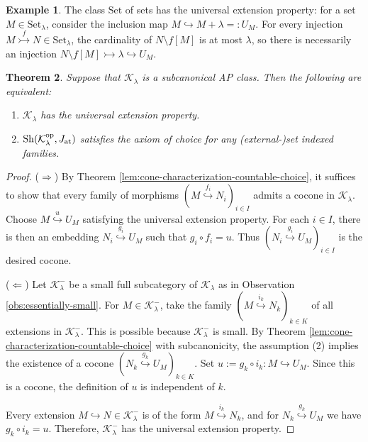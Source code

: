 \documentclass[10pt]{amsart}
\numberwithin{equation}{section}
\theoremstyle{plain}
\newtheorem{theorem}{Theorem}[section]
\theoremstyle{definition}
\newtheorem{example}[theorem]{Example}
\newcommand{\K}{\mathcal{K}}
\newcommand{\inj}{\rightarrowtail}
\newcommand{\mono}{\rightarrowtail}
\newcommand{\embed}{\hookrightarrow}
\newcommand{\monoedge}[1]{\overset{#1}{\inj}}
\newcommand{\embedge}[1]{\overset{#1}{\embed}}
\begin{document}
\begin{example}\label{exa:set-universal-extension}
The class $\mathrm{Set}$ of sets has the universal extension property:
for a set $M\in\mathrm{Set}_\lambda$, consider the inclusion map $M\embed M+\lambda=:U_M$.
For every injection $M\monoedge{f}N\in\mathrm{Set}_\lambda$, the cardinality of $N\setminus f[M]$ is at most $\lambda$, so there is necessarily an injection $N\setminus f[M]\mono \lambda\embed U_M$.
\end{example}

\begin{theorem}\label{thm:choice-vs-universal-extension}
Suppose that $\K_\lambda$ is a subcanonical AP class.
Then the following are equivalent:
\begin{enumerate}
\item $\K_\lambda$ has the universal extension property.
\item ${\rm Sh}(\K_\lambda^{\rm op},J_{\rm at})$ satisfies the axiom of choice for any (external-)set indexed families.
\end{enumerate}
\end{theorem}

\begin{proof}
($\Rightarrow$)
By Theorem \ref{lem:cone-characterization-countable-choice}, it suffices to show that every family of morphisms $(M\embedge{f_i} N_i)_{i\in I}$ admits a cocone in $\K_\lambda$.
Choose $M\embedge{u}U_M$ satisfying the universal extension property.
For each $i\in I$, there is then an embedding $N_i\embedge{g_i}U_M$ such that $g_i\circ f_i=u$.
Thus $(N_i\embedge{g_i}U_M)_{i\in I}$ is the desired cocone.

($\Leftarrow$)
Let $\K_\lambda^-$ be a small full subcategory of $\K_\lambda$ as in Observation \ref{obs:essentially-small}.
For $M\in\K_\lambda^-$, take the family $(M\embedge{i_k} N_k)_{k\in K}$ of all extensions in $\K_\lambda^-$.
This is possible because $\K_\lambda^-$ is small.
By Theorem \ref{lem:cone-characterization-countable-choice} with subcanonicity, the assumption (2) implies the existence of a cocone $(N_k\embedge{g_k} U_M)_{k\in K}$.
Set $u:=g_k\circ i_k\colon M\embed U_M$.
Since this is a cocone, the definition of $u$ is independent of $k$.

Every extension $M\embed N\in\K_\lambda^-$ is of the form $M\embedge{i_k}N_k$, and for $N_k\embedge{g_k}U_M$ we have $g_k\circ i_k=u$.
Therefore, $\K_\lambda^-$ has the universal extension property.
\end{proof}
\end{document}
